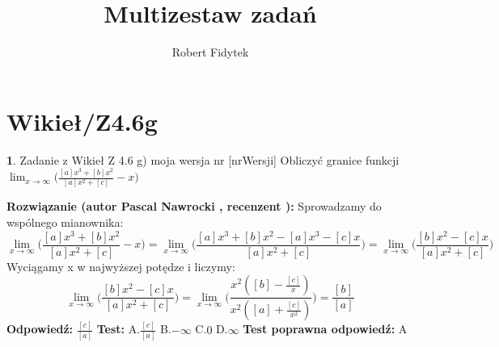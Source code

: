 \documentclass[12pt, a4paper]{article}
\title{Multizestaw zadań}
\author{Robert Fidytek}
\date{}
\theoremstyle{definition} %
\newtheorem{zad}{}
\newcommand{\kategoria}[1]{\section{#1}} %
\newcommand{\zadStart}[1]{\begin{zad}#1\newline} %
\newcommand{\zadStop}{\end{zad}}   %
\newcommand{\rozwStart}[2]{\noindent \textbf{Rozwiązanie (autor #1 , recenzent #2): }\newline} %
\newcommand{\rozwStop}{\newline}                                            %
\newcommand{\odpStart}{\noindent \textbf{Odpowiedź:}\newline}    %
\newcommand{\odpStop}{\newline}                                             %
\newcommand{\testStart}{\noindent \textbf{Test:}\newline} %
\newcommand{\testStop}{\newline} %
\newcommand{\kluczStart}{\noindent \textbf{Test poprawna odpowiedź:}\newline} %
\newcommand{\kluczStop}{\newline} %
\begin{document}
\maketitle


\kategoria{Wikieł/Z4.6g}
\zadStart{Zadanie z Wikieł Z 4.6 g) moja wersja nr [nrWersji]}
Obliczyć granice funkcji $\displaystyle{\lim_{x \to \infty}}\bigg(\frac{[a]x^3+[b]x^2}{[a]x^2+[c]}-x\bigg)$
\zadStop
\rozwStart{Pascal Nawrocki}{}
Sprowadzamy do wspólnego mianownika:
$$\displaystyle{\lim_{x \to \infty}}\bigg(\frac{[a]x^3+[b]x^2}{[a]x^2+[c]}-x\bigg)=\displaystyle{\lim_{x \to \infty}}\bigg(\frac{[a]x^3+[b]x^2-[a]x^3-[c]x}{[a]x^2+[c]}\bigg)=\displaystyle{\lim_{x \to \infty}}\bigg(\frac{[b]x^2-[c]x}{[a]x^2+[c]}\bigg)$$
Wyciągamy x w najwyższej potędze i liczymy:
$$\displaystyle{\lim_{x \to \infty}}\bigg(\frac{[b]x^2-[c]x}{[a]x^2+[c]}\bigg)=\displaystyle{\lim_{x \to \infty}}\bigg(\frac{x^2([b]-\frac{[c]}{x})}{x^2([a]+\frac{[c]}{x^2})}\bigg)=\frac{[b]}{[a]}$$
\rozwStop
\odpStart
$\frac{[c]}{[a]}$
\odpStop
\testStart
A.$\frac{[c]}{[a]}$
B.$-\infty$
C.$0$
D.$\infty$
\testStop
\kluczStart
A
\kluczStop
\end{document}
